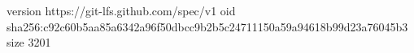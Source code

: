 version https://git-lfs.github.com/spec/v1
oid sha256:c92c60b5aa85a6342a96f50dbcc9b2b5c24711150a59a94618b99d23a76045b3
size 3201

